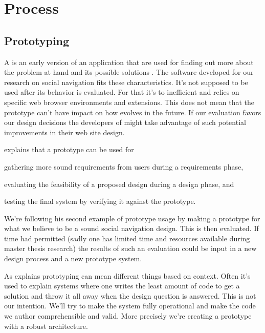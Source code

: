 \section{Process}

\subsection{Prototyping}

A  is an early version of an application that are used for
finding out more about the problem at hand and its possible solutions
\citep[]{sommerville06}.
The software developed for our research on social navigation fits these
characteristics. It's not supposed to be used after its behavior is
evaluated. For that it's to inefficient and relies on specific web browser
environments and extensions. This does not mean that the prototype can't have
impact on how \urort{} evolves in the future. If our evaluation favors our
design decisions the developers of \urort{} might take advantage of such
potential improvements in their web site design.

\citet[]{sommerville06} explains that a prototype can be used for
\begin{inparaenum}[(i)]
  \item gathering more sound requirements from users during a
    requirements phase,
  \item evaluating the feasibility of a proposed design during a
    design phase, and
  \item testing the final system by verifying it against the prototype.
\end{inparaenum}
We're following his second example of prototype usage by making a prototype
for what we believe to be a sound social navigation design. This is then
evaluated. If time had permitted (sadly one has limited time and resources
available during master thesis research) the results of such an evaluation
could be input in a new design process and a new prototype system.

As \citet[]{mcconnell04} explains prototyping can mean different things
based on context. Often it's used to explain systems where one writes the
least amount of code to get a solution and throw it all away when the design
question is answered. This is not our intention. We'll try to make the system
fully operational and make the code we author comprehensible and
valid. More precisely we're creating a  prototype
\cite[]{rudd96} with a robust architecture.

